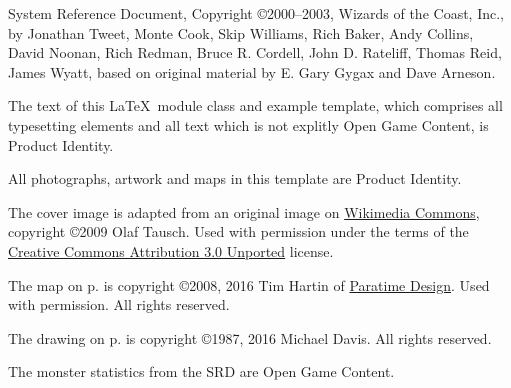 \documentclass[letterpaper,serif]{module}
\begin{document}
\begin{ogl}
\item System Reference Document, Copyright \copyright 2000--2003, Wizards of the Coast, Inc., by Jonathan Tweet, Monte Cook,
Skip Williams, Rich Baker, Andy Collins, David Noonan, Rich Redman, Bruce R. Cordell, John D. Rateliff, Thomas Reid, James
Wyatt, based on original material by E. Gary Gygax and Dave Arneson.
\end{ogl}

\begin{productidentity}
\item The text of this \LaTeX~module class and example template, which comprises all typesetting elements and all text which
is not explitly Open Game Content, is Product Identity.
\modulecopyright

\item All photographs, artwork and maps in this template are Product Identity.

\item The cover image is adapted from an original image on
\href{https://commons.wikimedia.org/wiki/File:Karnak_Tempel_Vorhof_05.jpg}{Wikimedia Commons}, copyright \copyright 2009 Olaf
Tausch. Used with permission under the terms of the
\href{https://creativecommons.org/licenses/by/3.0/deed.en}{Creative Commons Attribution 3.0 Unported} license.

\item The map on p.\pageref{img:map} is copyright \copyright 2008, 2016 Tim Hartin of \href{http://paratime.ca}{Paratime Design}.
Used with permission. All rights reserved.

\item The drawing on p.\pageref{img:tomb} is copyright \copyright 1987, 2016 Michael Davis. All rights reserved.
\end{productidentity}

\begin{opengamecontent}
\item The monster statistics from the SRD are Open Game Content.
\end{opengamecontent}

%
%

\tableofcontents

\end{document}
